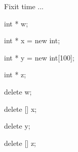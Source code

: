 Fixit time ...



\begin{consolethree}[escapeinside=||]

int * w;

int * x = new int;

int * y = new int[100];

int * z;

delete w;

delete [] x;

delete y;

delete [] z;

\end{consolethree}

